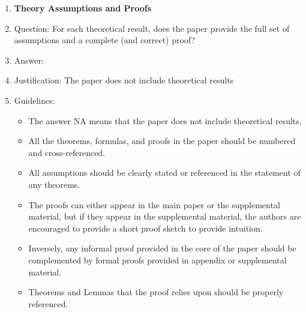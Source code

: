 \documentclass{article}
\begin{document}
\begin{enumerate}
\item {\bf Theory Assumptions and Proofs}
    \item[] Question: For each theoretical result, does the paper provide the full set of assumptions and a complete (and correct) proof?
    \item[] Answer: \answerNA{} %
    \item[] Justification: The paper does not include theoretical results
    \item[] Guidelines:
    \begin{itemize}
        \item The answer NA means that the paper does not include theoretical results. 
        \item All the theorems, formulas, and proofs in the paper should be numbered and cross-referenced.
        \item All assumptions should be clearly stated or referenced in the statement of any theorems.
        \item The proofs can either appear in the main paper or the supplemental material, but if they appear in the supplemental material, the authors are encouraged to provide a short proof sketch to provide intuition. 
        \item Inversely, any informal proof provided in the core of the paper should be complemented by formal proofs provided in appendix or supplemental material.
        \item Theorems and Lemmas that the proof relies upon should be properly referenced. 
    \end{itemize}


\end{enumerate}
\end{document}
